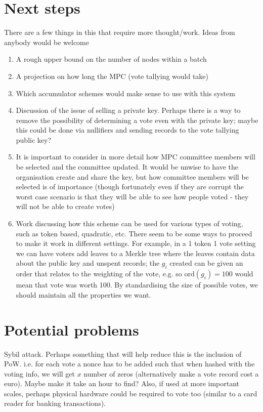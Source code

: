\documentclass{article}
\begin{document}
\section{Next steps}
There are a few things in this that require more thought/work. Ideas from anybody would be welcome
\begin{enumerate}
    \item A rough upper bound on the number of nodes within a batch
    \item A projection on how long the MPC (vote tallying would take)
    \item Which accumulator schemes would make sense to use with this system
    \item Discussion of the issue of selling a private key. Perhaps there is a way to remove the possibility of determining a vote even with the private key; maybe this could be done via nullifiers and sending records to the vote tallying public key?
    \item It is important to consider in more detail how MPC committee members will be selected and the committee updated. It would be unwise to have the organisation create and share the key, but how committee members will be selected is of importance (though fortunately even if they are corrupt the worst case scenario is that they will be able to see how people voted - they will not be able to create votes)
    \item Work discussing how this scheme can be used for various types of voting, such as token based, quadratic, etc. There seem to be some ways to proceed to make it work in different settings. For example, in a 1 token 1 vote setting we can have voters add leaves to a Merkle tree where the leaves contain data about the public key and unspent records; the $g_i$ created can be given an order that relates to the weighting of the vote, e.g. so $\text{ord}(g_i) = 100$ would mean that vote was worth 100. By standardising the size of possible votes, we should maintain all the properties we want.
\end{enumerate}

\section{Potential problems}
Sybil attack. Perhaps something that will help reduce this is the inclusion of PoW. i.e. for each vote a nonce has to be added such that when hashed with the voting info, we will get $x$ number of zeros (alternatively make a vote record cost a euro). Maybe make it take an hour to find? Also, if used at more important scales, perhaps physical hardware could be required to vote too (similar to a card reader for banking transactions).
\end{document}
